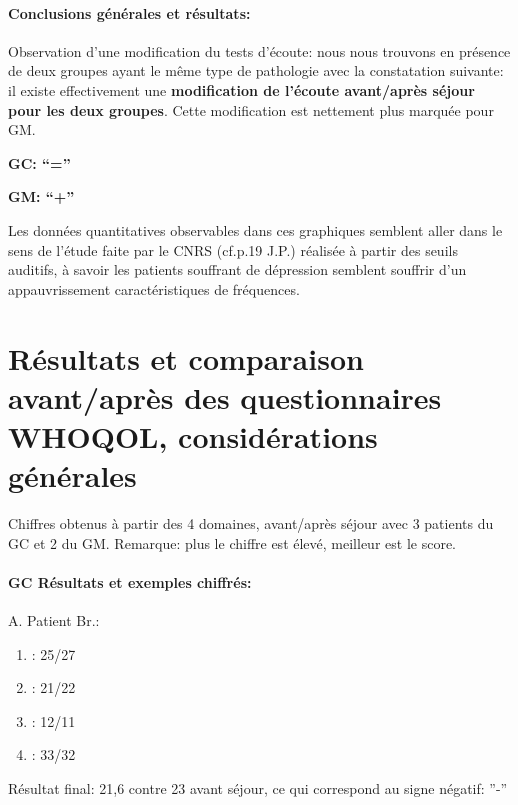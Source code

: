 	\begin{enumerate}


          \paragraph{ Conclusions générales et résultats:}

   Observation
             d'une modification du tests d'écoute: nous nous trouvons
           en présence de deux groupes ayant le même type de
           pathologie avec la constatation suivante: il existe effectivement
          une \textbf{modification de l'écoute avant/après séjour pour les
          deux groupes}.
          Cette modification est nettement plus marquée
          pour GM.
         
          \textbf{GC:  ``=''}

          \textbf{GM: ``+''}

          
          
Les données quantitatives observables dans ces graphiques semblent aller dans le
sens de  l'étude faite par le
CNRS (cf.p.19 J.P.) réalisée à partir des seuils auditifs, à savoir
les patients souffrant de dépression semblent souffrir d'un
appauvrissement caractéristiques de fréquences.


\section{Résultats et comparaison avant/après des questionnaires WHOQOL,
  considérations générales}

Chiffres obtenus à partir des 4
domaines, avant/après séjour avec 3 patients du GC et 2 du GM.
Remarque: plus le chiffre est élevé, meilleur est le score.
\paragraph{ GC Résultats et exemples chiffrés:}



A. Patient Br.:

	\begin{enumerate}
 		\item : 25/27 
 		\item : 21/22
 		\item : 12/11
 		\item : 33/32
                \end{enumerate}
                
        Résultat final: 21,6 contre 23 avant séjour,  ce qui
        correspond au signe négatif: ''-''


\end{enumerate}
